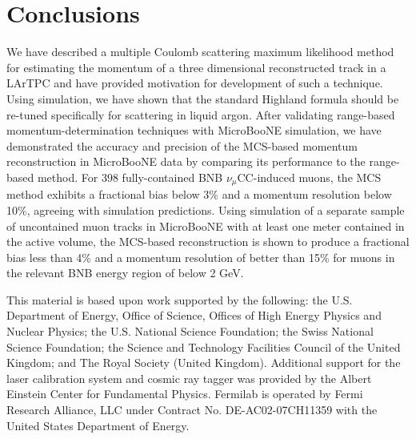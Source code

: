 \documentclass[a4paper,11pt]{article}
\begin{document}
\section{Conclusions}
We have described a multiple Coulomb scattering maximum likelihood method for estimating the momentum of a three dimensional reconstructed track in a LArTPC and have provided motivation for development of such a technique. Using simulation, we have shown that the standard Highland formula should be re-tuned specifically for scattering in liquid argon. After validating range-based momentum-determination techniques with MicroBooNE simulation, we have demonstrated the accuracy and precision of the MCS-based momentum reconstruction in MicroBooNE data by comparing its performance to the range-based method. For 398 fully-contained BNB $\nu_\mu$CC-induced muons, the MCS method exhibits a fractional bias below 3\% and a momentum resolution below 10\%, agreeing with simulation predictions. Using simulation of a separate sample of uncontained muon tracks in MicroBooNE with at least one meter contained in the active volume, the MCS-based reconstruction is shown to produce a fractional bias less than 4\% and a momentum resolution of better than 15\% for muons in the relevant BNB energy region of below 2 GeV.

\acknowledgments
This material is based upon work supported by the following: the U.S. Department of Energy, Office of Science, Offices of High Energy Physics and Nuclear Physics; the U.S. National Science Foundation; the Swiss National Science Foundation; the Science and Technology Facilities Council of the United Kingdom; and The Royal Society (United Kingdom). Additional support for the laser calibration system and cosmic ray tagger was provided by the Albert Einstein Center for Fundamental Physics. Fermilab is operated by Fermi Research Alliance, LLC under Contract No. DE-AC02-07CH11359 with the United States Department of Energy.
\end{document}
